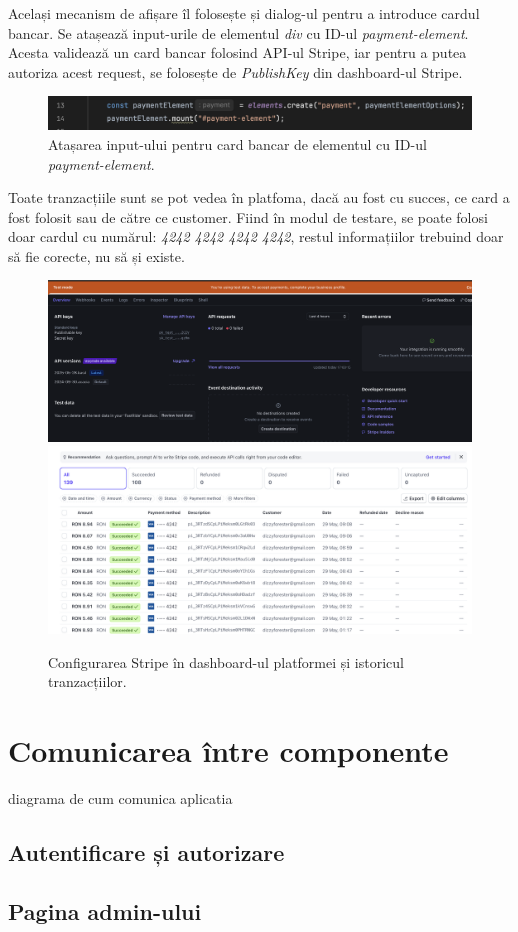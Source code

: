 Același mecanism de afișare îl folosește și dialog-ul pentru a introduce cardul bancar. 
Se atașează input-urile de elementul \textit{div} cu ID-ul \textit{payment-element}. Acesta
validează un card bancar folosind API-ul Stripe, iar pentru a putea autoriza acest request,
se folosește de \textit{PublishKey} din dashboard-ul Stripe.

\begin{figure}[H]
    \centering
    \includegraphics[width=14cm]{Assets/stripeMount.png}
    \caption{Atașarea input-ului pentru card bancar de elementul cu ID-ul \textit{payment-element}.}
    \label{fig:stripeMount}
\end{figure}

Toate tranzacțiile sunt se pot vedea în platfoma, dacă au fost cu succes, ce card a fost folosit sau de către ce customer.
Fiind în modul de testare, se poate folosi doar cardul cu numărul: \textit{4242 4242 4242 4242}, restul informațiilor
trebuind doar să fie corecte, nu să și existe.

\begin{figure}[H]
    \centering
    \includegraphics[width=14cm]{Assets/stripeSite.png}
    \includegraphics[width=14cm]{Assets/stripeHistory.png}
    \caption{Configurarea Stripe în dashboard-ul platformei și istoricul tranzacțiilor.}
    \label{fig:stripeSiteHistory}
\end{figure}

\section{Comunicarea între componente}
diagrama de cum comunica aplicatia
\subsection{Autentificare și autorizare}
\subsection{Pagina admin-ului}